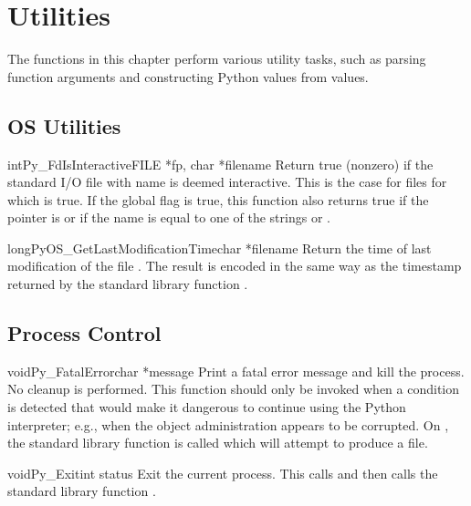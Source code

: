 \documentclass{manual}
\begin{document}
\chapter{Utilities \label{utilities}}

The functions in this chapter perform various utility tasks, such as
parsing function arguments and constructing Python values from \C{}
values.

\section{OS Utilities \label{os}}

\begin{cfuncdesc}{int}{Py_FdIsInteractive}{FILE *fp, char *filename}
Return true (nonzero) if the standard I/O file  with name
 is deemed interactive.  This is the case for files for
which  is true.  If the global flag
 is true, this function also returns true if
the  pointer is \NULL{} or if the name is equal to one of
the strings  or .
\end{cfuncdesc}

\begin{cfuncdesc}{long}{PyOS_GetLastModificationTime}{char *filename}
Return the time of last modification of the file .
The result is encoded in the same way as the timestamp returned by
the standard \C{} library function .
\end{cfuncdesc}


\section{Process Control \label{processControl}}

\begin{cfuncdesc}{void}{Py_FatalError}{char *message}
Print a fatal error message and kill the process.  No cleanup is
performed.  This function should only be invoked when a condition is
detected that would make it dangerous to continue using the Python
interpreter; e.g., when the object administration appears to be
corrupted.  On \UNIX{}, the standard \C{} library function
 is called which will attempt to produce a
 file.
\end{cfuncdesc}

\begin{cfuncdesc}{void}{Py_Exit}{int status}
Exit the current process.  This calls  and
then calls the standard \C{} library function
.
\end{cfuncdesc}
\end{document}
